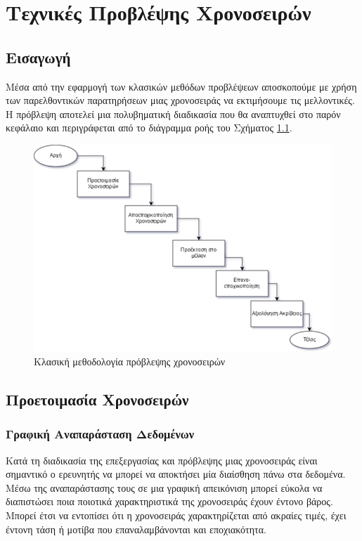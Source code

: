 \chapter{Τεχνικές Προβλέψης Χρονοσειρών}
\label{chap3}

\section{Εισαγωγή}
Μέσα από την εφαρμογή των κλασικών μεθόδων προβλέψεων αποσκοπούμε με χρήση των παρελθοντικών παρατηρήσεων μιας χρονοσειράς να εκτιμήσουμε τις μελλοντικές.
Η πρόβλεψη αποτελεί μια πολυβηματική διαδικασία που θα αναπτυχθεί στο παρόν κεφάλαιο και περιγράφεται από το διάγραμμα ροής του Σχήματος \ref{classicmethodology}.

\begin{figure}[t!]
  \includegraphics[scale=0.5]{figures/classicforecasting(1).png}
\centering
\caption{Κλασική μεθοδολογία πρόβλεψης χρονοσειρών}
\label{classicmethodology}
\end{figure} 



\section{Προετοιμασία Χρονοσειρών}

\subsection{Γραφική Αναπαράσταση Δεδομένων}
Κατά τη διαδικασία της επεξεργασίας και πρόβλεψης μιας χρονοσειράς είναι σημαντικό ο ερευνητής να μπορεί να αποκτήσει μία διαίσθηση πάνω στα δεδομένα. Μέσω της αναπαράστασης τους σε μια γραφική απεικόνιση μπορεί εύκολα να διαπιστώσει ποια ποιοτικά χαρακτηριστικά της χρονοσειράς έχουν έντονο βάρος. Μπορεί έτσι να εντοπίσει ότι η χρονοσειράς χαρακτηρίζεται από ακραίες τιμές, έχει έντονη τάση ή μοτίβα που επαναλαμβάνονται και εποχιακότητα.



